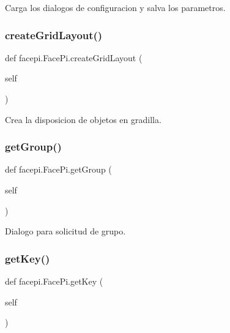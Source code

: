 Carga los dialogos de configuracion y salva los parametros. 

\mbox{\label{classfacepi_1_1_face_pi_a18271336c0cf8270a1f1a50acb4b4953}} 
\subsubsection{\texorpdfstring{create\+Grid\+Layout()}{createGridLayout()}}
{\footnotesize\ttfamily def facepi.\+Face\+Pi.\+create\+Grid\+Layout (\begin{DoxyParamCaption}\item[{}]{self }\end{DoxyParamCaption})}



Crea la disposicion de objetos en gradilla. 

\mbox{\label{classfacepi_1_1_face_pi_a399f4c1740f88e9b742051a8d2332f55}} 
\subsubsection{\texorpdfstring{get\+Group()}{getGroup()}}
{\footnotesize\ttfamily def facepi.\+Face\+Pi.\+get\+Group (\begin{DoxyParamCaption}\item[{}]{self }\end{DoxyParamCaption})}



Dialogo para solicitud de grupo. 

\mbox{\label{classfacepi_1_1_face_pi_af0325d200c0071bffaa042c128b5abac}} 
\subsubsection{\texorpdfstring{get\+Key()}{getKey()}}
{\footnotesize\ttfamily def facepi.\+Face\+Pi.\+get\+Key (\begin{DoxyParamCaption}\item[{}]{self }\end{DoxyParamCaption})}



